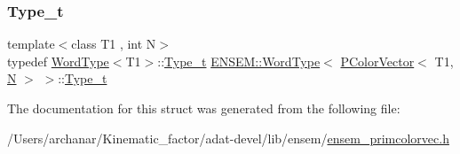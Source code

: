 \subsubsection{\texorpdfstring{Type\_t}{Type\_t}\hspace{0.1cm}{\footnotesize\ttfamily [3/3]}}
{\footnotesize\ttfamily template$<$class T1 , int N$>$ \\
typedef \mbox{\hyperlink{structENSEM_1_1WordType}{Word\+Type}}$<$T1$>$\+::\mbox{\hyperlink{structENSEM_1_1WordType_3_01PColorVector_3_01T1_00_01N_01_4_01_4_a86e73ce3277cd28d9e0550e1989ad245}{Type\+\_\+t}} \mbox{\hyperlink{structENSEM_1_1WordType}{E\+N\+S\+E\+M\+::\+Word\+Type}}$<$ \mbox{\hyperlink{classENSEM_1_1PColorVector}{P\+Color\+Vector}}$<$ T1, \mbox{\hyperlink{adat__devel_2lib_2hadron_2operator__name__util_8cc_a7722c8ecbb62d99aee7ce68b1752f337}{N}} $>$ $>$\+::\mbox{\hyperlink{structENSEM_1_1WordType_3_01PColorVector_3_01T1_00_01N_01_4_01_4_a86e73ce3277cd28d9e0550e1989ad245}{Type\+\_\+t}}}



The documentation for this struct was generated from the following file\+:\begin{DoxyCompactItemize}
\item 
/\+Users/archanar/\+Kinematic\+\_\+factor/adat-\/devel/lib/ensem/\mbox{\hyperlink{adat-devel_2lib_2ensem_2ensem__primcolorvec_8h}{ensem\+\_\+primcolorvec.\+h}}\end{DoxyCompactItemize}
